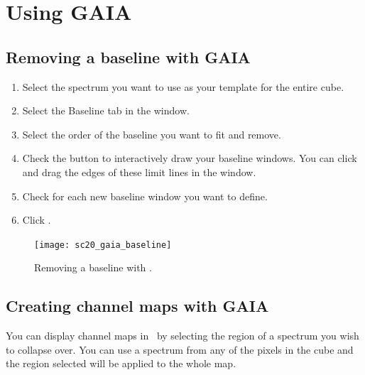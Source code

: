 \documentclass[11pt,oneside,chapters]{starlink}
\begin{document}
\clearpage
\chapter{Using GAIA}
\label{sec:gaia}

\section{Removing a baseline with GAIA}
\label{sec:gaiabaseline}

\begin{enumerate}[label=(\textbf{\arabic*})]
\item Select the spectrum you want to use as your template for the entire cube.

\item Select the Baseline tab in the  window.

\item Select the order of the baseline you want to fit and remove.

\item Check the  button to
interactively draw your baseline windows. You can click and drag the
edges of these limit lines in the  window.

\item Check  for each new baseline window you want to define.

\item Click .
\end{enumerate}

\begin{figure}[h!]
\begin{center}
\texttt{[image: sc20\_gaia\_baseline]}
\caption[Removing a baseline with \gaia.]{\label{fig:gaiabaseline}
  Removing a baseline with \gaia.}
\end{center}
\end{figure}

\section{Creating channel maps with GAIA}
\label{sec:gaiachannel}

You can display channel maps in \gaia\ by selecting the region of a
spectrum you wish to collapse over. You can use a spectrum from any of
the pixels in the cube and the region selected will be applied to the
whole map.
\end{document}
